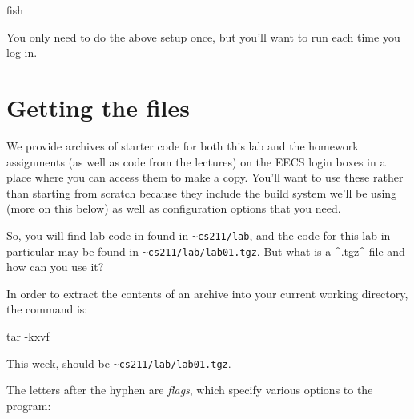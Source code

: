 \documentclass{tufte-handout}
\begin{document}
\begin{CmdLine*}
  \C fish \\
\end{CmdLine*}

You only need to do the above setup once, but you’ll
want to run  each time you log in.


\section{Getting the files}

We provide archives of starter code for both this lab and the homework
assignments (as well as code from the lectures) on the EECS login boxes
in a place where you can access them to make a copy. You'll want to use
these rather than starting from scratch because they include the build
system we’ll be using (more on this below) as well as configuration
options that you need.

So, you will find lab code in found in \verb^~cs211/lab^,%
 and the code for this lab in
particular may be found in \verb^~cs211/lab/lab01.tgz^. But what is a ^.tgz^
file and how can you use it?

In order to extract the contents of an archive into your current working
directory, the command is:

\begin{CmdLine*}
  \C tar -kxvf \\
\end{CmdLine*}

\noindent
This week,  should be \verb^~cs211/lab/lab01.tgz^.

The letters after the hyphen are \emph{flags}, which specify various
options to the program:
\end{document}
